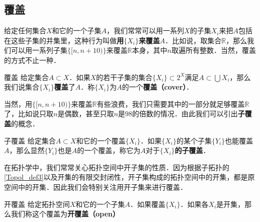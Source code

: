 \subsection{覆盖}

给定任何集合$X$和它的一个子集$A$，我们常常可以用一系列$X$的子集$X_i$来把$A$包括在这些子集的并集里，这种行为叫做\textbf{用$\{X_i\}$来覆盖$A$}．比如说，取集合$\mathbb{R}$，那么我们可以用一系列子集$\{[n, n+10)\}$来覆盖$\mathbb{R}$本身，其中$n$取遍所有整数．当然，覆盖的方式不止一种．

\begin{definition}{覆盖}
给定集合$A\subset X$．如果$X$的若干子集的集合$\{X_i\}\subset 2^X$满足$A\subset\bigcup X_i$，那么我们说集合$\{X_i\}$\textbf{覆盖}了$A$．称$\{X_i\}$为$A$的一个\textbf{覆盖（cover）}．
\end{definition}

当然，用$\{[n, n+10)\}$来覆盖$\mathbb{R}$有些浪费，我们只需要其中的一部分就足够覆盖$\mathbb{R}$了，比如说只取$n$是偶数，甚至只取$n$是$98$的倍数的情况．由此我们可以引出\textbf{子覆盖}的概念．

\begin{definition}{子覆盖}
给定集合$A\subset X$和它的一个覆盖$\{X_i\}$．如果$\{X_i\}$的某个子集$\{Y_i\}$也能覆盖$A$，那么显然$\{Y_i\}$也是$A$的一个覆盖，称它为\textbf{$A对于\{X_i\}$的子覆盖}．
\end{definition}

在拓扑学中，我们常常关心拓扑空间中开子集的性质．因为根据子拓扑的\autoref{Topol_def3}以及开集的有限交封闭性，开子集构成的拓扑空间中的开集，都是原空间中的开集．因此我们会特别关注用开子集来进行覆盖．

\begin{definition}{开覆盖}
给定拓扑空间$X$和它的一个子集$A$．如果覆盖$\{X_i\}$．如果各$X_i$是开集，那么我们称这个覆盖为\textbf{开覆盖（open）}
\end{definition}